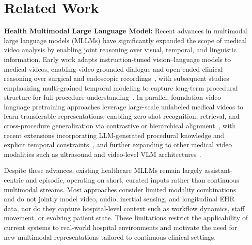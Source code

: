 \section{Related Work}
\label{sec:related}

\textbf{Health Multimodal Large Language Model:}
Recent advances in multimodal large language models (MLLMs) have significantly expanded the scope of medical video analysis by enabling joint reasoning over visual, temporal, and linguistic information. Early work adapts instruction-tuned vision--language models to medical videos, enabling video-grounded dialogue and open-ended clinical reasoning over surgical and endoscopic recordings~\cite{li2024llava, wang2025endochat}, with subsequent studies emphasizing multi-grained temporal modeling to capture long-term procedural structure for full-procedure understanding~\cite{wang2025surgvidlm}. In parallel, foundation video--language pretraining approaches leverage large-scale unlabeled medical videos to learn transferable representations, enabling zero-shot recognition, retrieval, and cross-procedure generalization via contrastive or hierarchical alignment~\cite{yuan2025learning, yuan2024hecvl}, with recent extensions incorporating LLM-generated procedural knowledge and explicit temporal constraints~\cite{yuan2024procedure}, and further expanding to other medical video modalities such as ultrasound and video-level VLM architectures~\cite{250320430de2419dbf0c23e14b4c4335, li2025surgpub}.

Despite these advances, existing healthcare MLLMs remain largely assistant-centric and episodic, operating on short, curated inputs rather than continuous multimodal streams. Most approaches consider limited modality combinations and do not jointly model video, audio, inertial sensing, and longitudinal EHR data, nor do they capture hospital-level context such as workflow dynamics, staff movement, or evolving patient state. These limitations restrict the applicability of current systems to real-world hospital environments and motivate the need for new multimodal representations tailored to continuous clinical settings.

